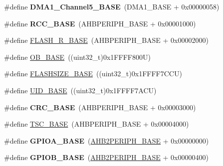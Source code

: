 \begin{DoxyCompactItemize}
\#define {\bfseries D\+M\+A1\+\_\+\+Channel5\+\_\+\+B\+A\+SE}~(D\+M\+A1\+\_\+\+B\+A\+SE + 0x00000058)
\item 
\mbox{\label{group___peripheral__memory__map_ga0e681b03f364532055d88f63fec0d99d}} 
\#define {\bfseries R\+C\+C\+\_\+\+B\+A\+SE}~(A\+H\+B\+P\+E\+R\+I\+P\+H\+\_\+\+B\+A\+SE + 0x00001000)
\item 
\#define \hyperlink{group___peripheral__memory__map_ga8e21f4845015730c5731763169ec0e9b}{F\+L\+A\+S\+H\+\_\+\+R\+\_\+\+B\+A\+SE}~(A\+H\+B\+P\+E\+R\+I\+P\+H\+\_\+\+B\+A\+SE + 0x00002000)
\item 
\#define \hyperlink{group___peripheral__memory__map_gab5b5fb155f9ee15dfb6d757da1adc926}{O\+B\+\_\+\+B\+A\+SE}~((uint32\+\_\+t)0x1\+F\+F\+F\+F800\+U)
\item 
\#define \hyperlink{group___peripheral__memory__map_ga776d985f2d4d40b588ef6ca9d573af78}{F\+L\+A\+S\+H\+S\+I\+Z\+E\+\_\+\+B\+A\+SE}~((uint32\+\_\+t)0x1\+F\+F\+F\+F7\+C\+C\+U)
\item 
\#define \hyperlink{group___peripheral__memory__map_ga664eda42b83c919b153b07b23348be67}{U\+I\+D\+\_\+\+B\+A\+SE}~((uint32\+\_\+t)0x1\+F\+F\+F\+F7\+A\+C\+U)
\item 
\mbox{\label{group___peripheral__memory__map_ga656a447589e785594cbf2f45c835ad7e}} 
\#define {\bfseries C\+R\+C\+\_\+\+B\+A\+SE}~(A\+H\+B\+P\+E\+R\+I\+P\+H\+\_\+\+B\+A\+SE + 0x00003000)
\item 
\#define \hyperlink{group___peripheral__memory__map_ga2bba7a31caeacaacd433abb71781e0af}{T\+S\+C\+\_\+\+B\+A\+SE}~(A\+H\+B\+P\+E\+R\+I\+P\+H\+\_\+\+B\+A\+SE + 0x00004000)
\item 
\mbox{\label{group___peripheral__memory__map_gad7723846cc5db8e43a44d78cf21f6efa}} 
\#define {\bfseries G\+P\+I\+O\+A\+\_\+\+B\+A\+SE}~(\hyperlink{group___peripheral__memory__map_gaeedaa71d22a1948492365e2cd26cfd46}{A\+H\+B2\+P\+E\+R\+I\+P\+H\+\_\+\+B\+A\+SE} + 0x00000000)
\item 
\mbox{\label{group___peripheral__memory__map_gac944a89eb789000ece920c0f89cb6a68}} 
\#define {\bfseries G\+P\+I\+O\+B\+\_\+\+B\+A\+SE}~(\hyperlink{group___peripheral__memory__map_gaeedaa71d22a1948492365e2cd26cfd46}{A\+H\+B2\+P\+E\+R\+I\+P\+H\+\_\+\+B\+A\+SE} + 0x00000400)
\item 

\end{DoxyCompactItemize}
